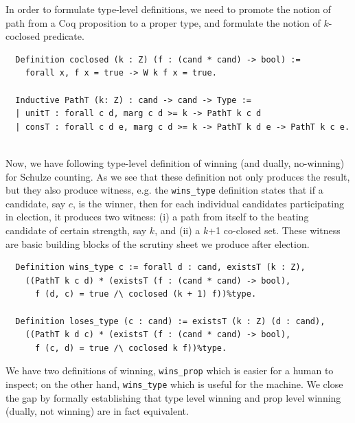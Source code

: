 \noindent
In order to formulate type-level definitions, we need to promote the
notion of path from a Coq proposition to a proper type, and
formulate the notion of $k$-coclosed predicate.

\begin{verbatim} 
  Definition coclosed (k : Z) (f : (cand * cand) -> bool) :=
    forall x, f x = true -> W k f x = true.

  Inductive PathT (k: Z) : cand -> cand -> Type :=
  | unitT : forall c d, marg c d >= k -> PathT k c d
  | consT : forall c d e, marg c d >= k -> PathT k d e -> PathT k c e.
 
\end{verbatim}

\noindent
Now, we have following type-level definition of winning (and dually, 
no-winning) for Schulze counting. As we see that these definition not only produces 
the result, but they also produce witness, e.g. the \texttt{wins\_type} definition 
states that if a candidate, say $c$, is the winner,  
then for each individual candidates participating in election, it produces two witness:
(i) a path from itself to the beating candidate of certain strength, say $k$, and 
(ii) a $k$+1 co-closed set.  These witness are basic building blocks of the 
scrutiny sheet we produce after election. 

\begin{verbatim}
  Definition wins_type c := forall d : cand, existsT (k : Z),
    ((PathT k c d) * (existsT (f : (cand * cand) -> bool),
      f (d, c) = true /\ coclosed (k + 1) f))%type.

  Definition loses_type (c : cand) := existsT (k : Z) (d : cand),
    ((PathT k d c) * (existsT (f : (cand * cand) -> bool),
      f (c, d) = true /\ coclosed k f))%type.
\end{verbatim}

\noindent
We have two definitions of winning, \texttt{wins\_prop} which is easier for a human to inspect; 
on the other hand, \texttt{wins\_type} which is useful for the machine. 
We close the gap by formally establishing that type level winning and prop level winning 
(dually, not winning) are in fact equivalent. 

